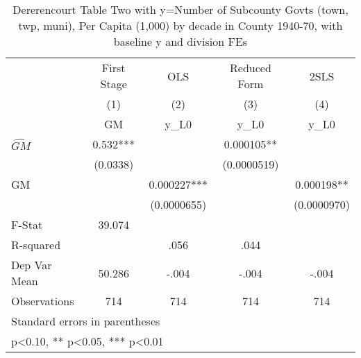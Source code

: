\begin{table}[htbp]\centering
\def\sym#1{\ifmmode^{#1}\else\(^{#1}\)\fi}
\caption{Dererencourt Table Two with y=Number of Subcounty Govts (town, twp, muni), Per Capita (1,000) by decade in County 1940-70, with baseline y and division FEs}
\begin{tabular}{l*{4}{c}}
\toprule
                    & First Stage   &         OLS   &Reduced Form   &        2SLS   \\
                    &\multicolumn{1}{c}{(1)}&\multicolumn{1}{c}{(2)}&\multicolumn{1}{c}{(3)}&\multicolumn{1}{c}{(4)}\\
                    &\multicolumn{1}{c}{GM}&\multicolumn{1}{c}{y\_L0}&\multicolumn{1}{c}{y\_L0}&\multicolumn{1}{c}{y\_L0}\\
\midrule
$\hat{GM}$          &       0.532***&               &    0.000105** &               \\
                    &    (0.0338)   &               & (0.0000519)   &               \\
\addlinespace
GM                  &               &    0.000227***&               &    0.000198** \\
                    &               & (0.0000655)   &               & (0.0000970)   \\
\midrule
F-Stat              &      39.074   &               &               &               \\
R-squared           &               &        .056   &        .044   &               \\
Dep Var Mean        &      50.286   &       -.004   &       -.004   &       -.004   \\
Observations        &         714   &         714   &         714   &         714   \\
\bottomrule
\multicolumn{5}{l}{\footnotesize Standard errors in parentheses}\\
\multicolumn{5}{l}{\footnotesize * p<0.10, ** p<0.05, *** p<0.01}\\
\end{tabular}
\end{table}
